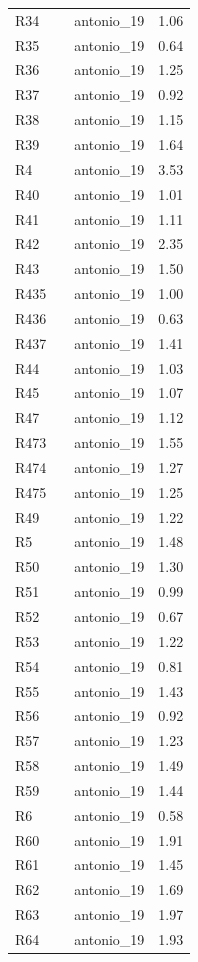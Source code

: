 \begin{longtable}[t]{lllr}
R34 &  & antonio\_19 & 1.06\\
R35 &  & antonio\_19 & 0.64\\
R36 &  & antonio\_19 & 1.25\\
R37 &  & antonio\_19 & 0.92\\
R38 &  & antonio\_19 & 1.15\\
R39 &  & antonio\_19 & 1.64\\
R4 &  & antonio\_19 & 3.53\\
R40 &  & antonio\_19 & 1.01\\
R41 &  & antonio\_19 & 1.11\\
R42 &  & antonio\_19 & 2.35\\
R43 &  & antonio\_19 & 1.50\\
R435 &  & antonio\_19 & 1.00\\
R436 &  & antonio\_19 & 0.63\\
R437 &  & antonio\_19 & 1.41\\
R44 &  & antonio\_19 & 1.03\\
R45 &  & antonio\_19 & 1.07\\
R47 &  & antonio\_19 & 1.12\\
R473 &  & antonio\_19 & 1.55\\
R474 &  & antonio\_19 & 1.27\\
R475 &  & antonio\_19 & 1.25\\
R49 &  & antonio\_19 & 1.22\\
R5 &  & antonio\_19 & 1.48\\
R50 &  & antonio\_19 & 1.30\\
R51 &  & antonio\_19 & 0.99\\
R52 &  & antonio\_19 & 0.67\\
R53 &  & antonio\_19 & 1.22\\
R54 &  & antonio\_19 & 0.81\\
R55 &  & antonio\_19 & 1.43\\
R56 &  & antonio\_19 & 0.92\\
R57 &  & antonio\_19 & 1.23\\
R58 &  & antonio\_19 & 1.49\\
R59 &  & antonio\_19 & 1.44\\
R6 &  & antonio\_19 & 0.58\\
R60 &  & antonio\_19 & 1.91\\
R61 &  & antonio\_19 & 1.45\\
R62 &  & antonio\_19 & 1.69\\
R63 &  & antonio\_19 & 1.97\\
R64 &  & antonio\_19 & 1.93\\

\end{longtable}
